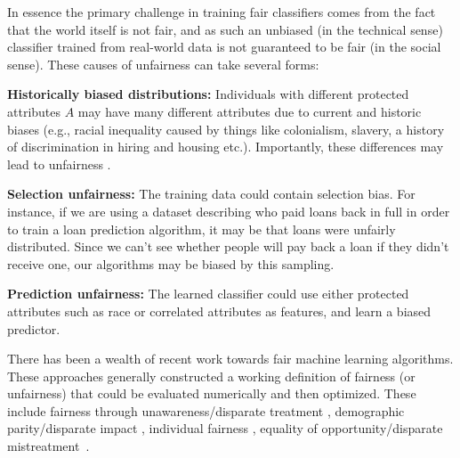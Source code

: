 In essence the primary challenge in training fair classifiers comes
from the fact that the world itself is not fair, and as such an
unbiased (in the technical sense) classifier trained from real-world
data is not guaranteed to be fair (in the social sense). These causes
of unfairness can take several forms:
\begin{description}
\item {\bf Historically biased distributions:} Individuals with different protected attributes $A$  may have many different attributes due to current and historic biases (e.g., racial inequality caused by things like colonialism,
slavery, a history of discrimination in hiring and
housing etc.). Importantly, these differences may lead to unfairness%
.
\item {\bf Selection unfairness:} The training data could contain selection bias. For instance, if we are using a dataset describing who paid loans back in full in order to train a loan prediction algorithm, it may be that loans were unfairly distributed. Since we can't see whether people will pay back a loan if they didn't receive one, our algorithms may be biased by this sampling.
\item {\bf Prediction unfairness:} The learned classifier could use either protected attributes such as race or correlated attributes as features, and  learn a biased predictor.
\end{description}
There has been a wealth of recent work towards fair machine learning
algorithms. %
These approaches generally constructed a working
definition of fairness (or unfairness) that could be evaluated numerically and  then
optimized. These include fairness through unawareness/disparate
treatment \cite{grgiccase,zafar2016fairness}, demographic
parity/disparate impact \cite{zafar2015learning}, individual fairness
\cite{dwork2012fairness,zemel2013learning,louizos2015variational,joseph2016rawlsian},
equality of opportunity/disparate
mistreatment~\cite{hardt2016equality,zafar2016fairness}.


